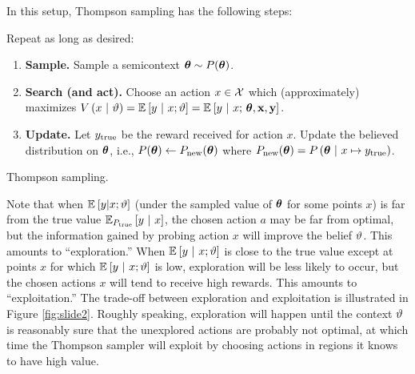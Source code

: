 In this setup, Thompson sampling has the following steps:
\begin{algorithm}[H]
  \singlespacing
  Repeat as long as desired:
  \begin{enumerate}
    \item\label{itm:thompson-step-sample} {\bf Sample.} Sample a semicontext
      $\thetabf \sim P(\thetabf)$.
    \item\label{itm:thompson-step-search} {\bf Search (and act).} Choose an
      action $x \in \Acal$ which (approximately) maximizes $V\pn{x \mvert
      \ttheta} = \Ebkt{y \mvert x; \ttheta} = \Ebkt{y \mvert x;\,\thetabf,
      \abf, \rbf}$.
    \item {\bf Update.} Let $y_\true$ be the reward received for action $x$.
      Update the believed distribution on $\thetabf$, i.e., $P(\thetabf) \gets
      P_\rmnew(\thetabf)$ where $P_\rmnew(\thetabf) = P\pn{\thetabf \mvert x \mapsto
      y_\true}$.
  \end{enumerate}
  \caption{Thompson sampling.}
  \label{alg:thompson}
\end{algorithm}
Note that when $\Ebkt{y|x;\ttheta}$ (under the sampled value of $\thetabf$ for
some points $x$) is far from the true value $\Ebkt[P_\true]{y \mvert x}$, the
chosen action $a$ may be far from optimal, but the information gained by probing
action $x$ will improve the belief $\ttheta$.  This amounts to ``exploration.''
When $\Ebkt{y \mvert x;\ttheta}$ is close to the true value except at points $x$
for which $\Ebkt{y \mvert x;\ttheta}$ is low, exploration will be less likely to
occur, but the chosen actions $x$ will tend to receive high rewards.  This
amounts to ``exploitation.'' The trade-off between exploration and exploitation
is illustrated in Figure \ref{fig:slide2}.  Roughly speaking, exploration will
happen until the context $\ttheta$ is reasonably sure that the unexplored
actions are probably not optimal, at which time the Thompson sampler will
exploit by choosing actions in regions it knows to have high value.


